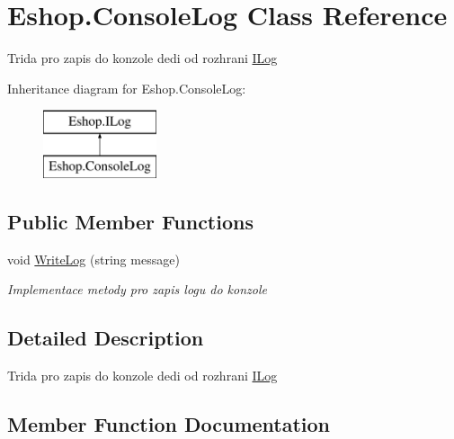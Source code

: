 \hypertarget{class_eshop_1_1_console_log}{}\section{Eshop.\+Console\+Log Class Reference}
\label{class_eshop_1_1_console_log}


Trida pro zapis do konzole dedi od rozhrani \mbox{\hyperlink{interface_eshop_1_1_i_log}{I\+Log}}  


Inheritance diagram for Eshop.\+Console\+Log\+:\begin{figure}[H]
\begin{center}
\leavevmode
\includegraphics[height=2.000000cm]{class_eshop_1_1_console_log}
\end{center}
\end{figure}
\subsection*{Public Member Functions}
\begin{DoxyCompactItemize}
\item 
void \mbox{\hyperlink{class_eshop_1_1_console_log_a7ecce6a47d2d5b0287045e435b020be8}{Write\+Log}} (string message)
\begin{DoxyCompactList}\small\item\em Implementace metody pro zapis logu do konzole \end{DoxyCompactList}\end{DoxyCompactItemize}


\subsection{Detailed Description}
Trida pro zapis do konzole dedi od rozhrani \mbox{\hyperlink{interface_eshop_1_1_i_log}{I\+Log}} 



\subsection{Member Function Documentation}
\mbox{\label{class_eshop_1_1_console_log_a7ecce6a47d2d5b0287045e435b020be8}} 
